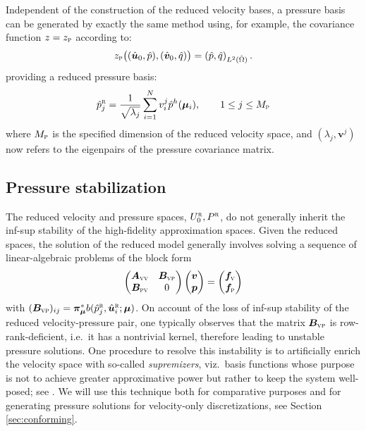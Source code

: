 \documentclass[onecolumn, twoside, a4paper, 11pt]{article}
\begin{document}
Independent of the construction of the reduced velocity bases, a pressure basis can
be generated by exactly the same method using, for example, the covariance function
$z=z_\textsc{p}$ according to:
%
\begin{equation}
z_\textsc{p}\big((\hat{\bm u}_0, \hat{p}), (\hat{\bm v}_0, \hat{q})\big) =
  \left( \hat{p}, \hat{q} \right)_{L^2(\hat{\Omega})}.
\end{equation}
%
providing a reduced pressure basis:
%
\begin{equation}
  \hat{p}^\textsc{r}_j = \frac{1}{\sqrt{\lambda_j}} \sum_{i=1}^N v^{j}_i \hat{p}^h(\bm{\mu}_i),
  \qquad 1 \leq j \leq M_\textsc{p}
\end{equation}
%
where $M_\textsc{p}$ is the specified dimension of the reduced velocity space, and $(\lambda_j,\bm{v}^j)$ now
refers to the eigenpairs of the pressure covariance matrix.


\subsection{Pressure stabilization}
\label{sec:stab}
The reduced velocity and pressure spaces, $U_0^{\textsc{r}},P^{\textsc{r}}$, do not generally inherit the
inf-sup stability of the high-fidelity approximation spaces. Given the reduced spaces, the solution of
the reduced model generally involves solving a sequence of linear-algebraic problems of the block form
%
\begin{equation}
  \label{eqn:sys-instab}
  \begin{pmatrix} \bm A_\textsc{vv} & \bm B_\textsc{vp} \\ \bm B_\textsc{pv} & 0\end{pmatrix}
  \begin{pmatrix} \bm v \\ \bm p \end{pmatrix}
  =
  \begin{pmatrix} \bm f_\textsc{v} \\ \bm f_\textsc{p} \end{pmatrix}
\end{equation}
%
with $(\bm B_\textsc{vp})_{ij}=\bm{\pi}^*_{\bm{\mu}}b(\hat{p}_j^\textsc{r},\hat{\bm{u}}_i^\textsc{r};\bm{\mu})$.
On account of the loss of inf-sup stability of the reduced velocity-pressure pair,
one typically observes that the matrix $\bm B_\textsc{vp}$ is row-rank-deficient, i.e.~it
has a nontrivial kernel, therefore leading to unstable pressure solutions. One procedure to resolve this
instability is to artificially enrich the velocity space with so-called
\emph{supremizers}, viz.~basis functions whose purpose is not to achieve greater approximative power but
rather to keep the system well-posed; see \cite{Ballarin2015ssp}. We will use this technique
both for comparative purposes and for generating pressure solutions for velocity-only
discretizations, see Section \ref{sec:conforming}.
\end{document}
